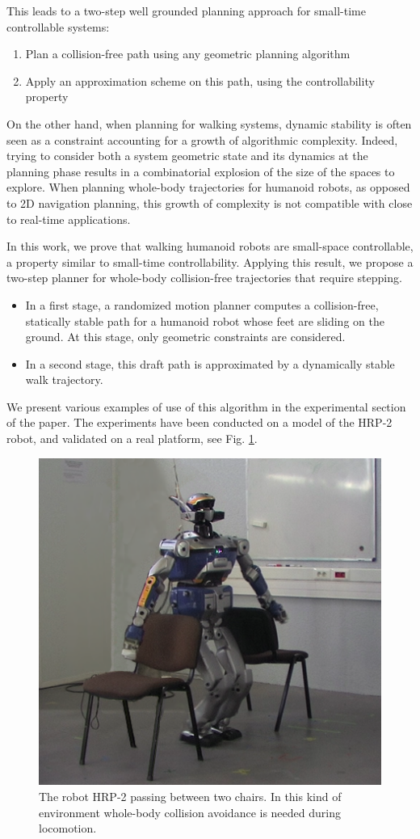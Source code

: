 \documentclass{article}
\begin{document}
This leads to a two-step well grounded planning approach for small-time 
controllable systems:
\begin{enumerate}
\item Plan a collision-free path using any geometric planning algorithm
\item Apply an approximation scheme on this path, using the controllability property
\end{enumerate}
On the other hand, when planning for walking systems, dynamic stability 
is often seen as a constraint accounting for a growth of algorithmic 
complexity. Indeed, trying to consider both a system geometric state and its 
dynamics at the  planning phase results in a combinatorial explosion of
the size of the spaces to explore. When planning whole-body trajectories for humanoid
robots, as opposed to 2D navigation planning, this growth of complexity
is not compatible with close to real-time applications.


In this work, we prove that walking humanoid robots are small-space 
controllable, a property similar to small-time controllability.
Applying this result, we propose a two-step planner for 
whole-body collision-free trajectories that require stepping.
\begin{itemize}
\item In  a first stage, a randomized motion
  planner computes a collision-free, statically stable path for a humanoid 
  robot whose feet
  are sliding  on the  ground. At this stage, only geometric constraints are considered.
\item In  a second stage,  this draft  path is
  approximated by  a dynamically stable walk  trajectory. 
\end{itemize}
We  present 
various examples of use  of this algorithm in
the  experimental section  of the  paper.  The  experiments  have been
conducted  on a  model of  the HRP-2  robot, and  validated on  a real
platform, see Fig. \ref{fig:couv}.


\begin{figure}[h]
\centering
\includegraphics[width=0.6\linewidth]{pics/chairs/couv.png}
\caption{The robot HRP-2 passing between two chairs. In this kind of
  environment whole-body collision avoidance is needed during
  locomotion.} 
\label{fig:couv}
\end{figure}
\end{document}
